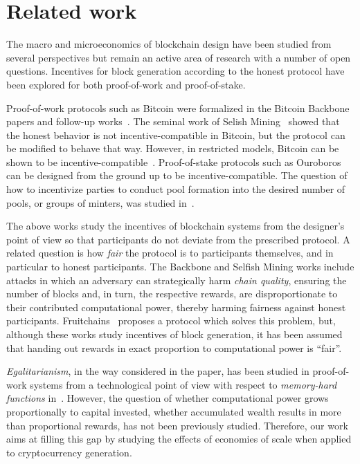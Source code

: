 \section{Related work}\label{sec:related}
The macro and microeconomics of blockchain design have been studied from
several perspectives but remain an active area of research with a number of open questions.
Incentives for block generation
according to the honest protocol have been explored for both proof-of-work and
proof-of-stake.

Proof-of-work protocols such as Bitcoin were formalized in the Bitcoin
Backbone~\cite{EC:GarKiaLeo15,C:GarKiaLeo17} papers and follow-up
works~\cite{pass2017analysis}. The seminal work of Selish
Mining~\cite{FC:EyaSir14,FC:SapSomZoh16} showed that the honest behavior is not
incentive-compatible in Bitcoin, but the protocol can be modified to behave
that way. However, in restricted models, Bitcoin can be shown to be incentive-compatible~\cite{kiayias2016blockchain}.  Proof-of-stake protocols such as
Ouroboros~\cite{C:KRDO17} can be designed from the ground up to be
incentive-compatible. The question of how to incentivize parties to conduct
pool formation into the desired number of pools, or groups of minters, was
studied in~\cite{bkks2018}.

The above works study the incentives of blockchain systems from the designer's
point of view so that participants do not deviate from the prescribed protocol.
A related question is how \emph{fair} the protocol is to participants
themselves, and in particular to honest participants. The Backbone and Selfish
Mining works include attacks in which an adversary can strategically harm
\emph{chain quality}, ensuring the number of blocks and, in turn, the respective
rewards, are disproportionate to their contributed computational power, thereby
harming fairness against honest participants. Fruitchains~\cite{PODC:PasShi17}
proposes a protocol which solves this problem, but, although
these works study incentives of block generation, it has been
assumed that handing out rewards in exact proportion to computational power is
``fair''.

\emph{Egalitarianism}, in the way considered in the paper, has been studied in
proof-of-work systems from a technological point of view with respect to
\emph{memory-hard functions} in~\cite{alwen2017depth,biryukov2016egalitarian}.
However, the question
of whether computational power grows proportionally to capital invested, \ie
whether accumulated wealth results in more than proportional rewards, has not
been previously studied. Therefore, our work aims at filling this gap by
studying the effects of economies of scale when applied to cryptocurrency
generation.

